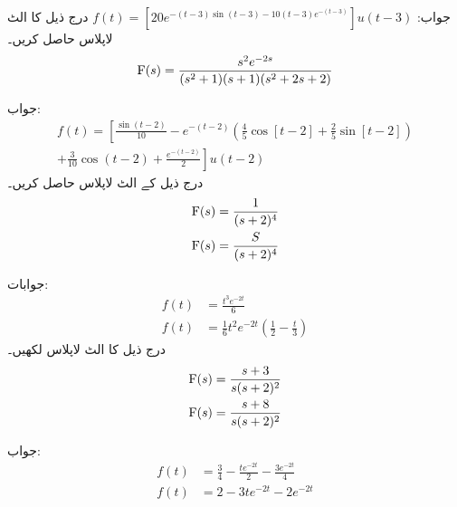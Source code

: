 جواب:
$f(t)=\left[20e^{-(t-3)\sin(t-3)-10(t-3)e^{-(t-3)}}\right]u(t-3)$
درج ذیل کا الٹ لاپلاس حاصل کریں۔
\begin{align*}
{\ensuremath{{\textup{F}}}}(s)=\frac{s^2e^{-2s}}{(s^2+1)(s+1)(s^2+2s+2)}
\end{align*}

جواب:
\begin{multline*}
f(t)=\left[\frac{\sin (t-2)}{10}-e^{-(t-2)} \left(\frac{4}{5}\cos [t-2]+\frac{2}{5}\sin [t-2]\right) \right.\\
\left.+\frac{3}{10}\cos (t-2)+\frac{e^{-(t-2)}}{2}\right]u(t-2)
\end{multline*}
درج ذیل کے الٹ لاپلاس حاصل کریں۔
\begin{align*}
{\ensuremath{{\textup{F}}}}(s)&=\frac{1}{(s+2)^4}\\
{{\textup{F}}}(s)&=\frac{S}{(s+2)^4}
\end{align*}

جوابات:
\begin{align*}
f(t)&=\frac{t^3 e^{-2t}}{6}\\
f(t)&=\frac{1}{6}t^2e^{-2t}\left(\frac{1}{2}-\frac{t}{3}\right)
\end{align*}
درج ذیل کا الٹ لاپلاس لکھیں۔
\begin{align*}
{\ensuremath{{\textup{F}}}}(s)&=\frac{s+3}{s(s+2)^2}\\
{{\textup{F}}}(s)&=\frac{s+8}{s(s+2)^2}
\end{align*}

جواب:
\begin{align*}
f(t)&=\frac{3}{4}-\frac{te^{-2t}}{2}-\frac{3e^{-2t}}{4}\\
f(t)&=2-3te^{-2t}-2e^{-2t}
\end{align*}
